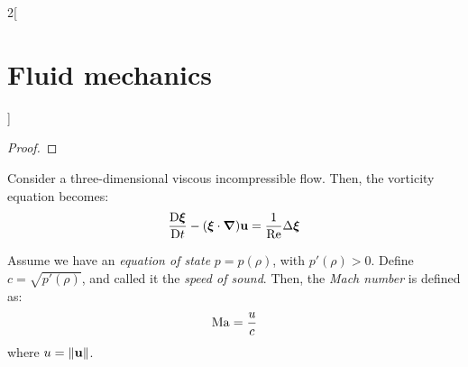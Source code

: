 \documentclass[../../../main_physics.tex]{subfiles}
\begin{document}
\begin{multicols}{2}[\section{Fluid mechanics}]
\begin{proof}
  \end{proof}
  \begin{proposition}
    Consider a three-dimensional viscous incompressible flow. Then, the vorticity equation becomes:
    $$
      \frac{\mathrm{D}\boldsymbol{\mathrm{\xi}}}{\mathrm{D}t}-(\boldsymbol{\mathrm{\xi}}\cdot\grad)\boldsymbol{\mathrm{u}}=\frac{1}{\mathrm{Re}}\Delta\boldsymbol{\mathrm{\xi}}
    $$
  \end{proposition}
  \begin{definition}
    Assume we have an \emph{equation of state} $p=p(\rho)$, with $p'(\rho)>0$. Define $c=\sqrt{p'(\rho)}$, and called it the \emph{speed of sound}. Then, the \emph{Mach number} is defined as:
    $$
      \mathrm{Ma}=\frac{u}{c}
    $$
    where $u=\left\|\boldsymbol{\mathrm{u}}\right\|$.
  \end{definition}
\end{multicols}
\end{document}
